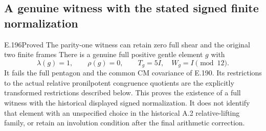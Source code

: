 \subsection{A genuine witness with the stated signed finite normalization}

\begin{result}{E.196}{Proved}
{The parity-one witness can retain zero full shear and the original two finite frames}
There is a genuine full positive gentle element \(g\) with
\[
       \lambda(g)=1,\qquad \rho(g)=0,\qquad
       T_g=5I,\quad W_g=I\pmod{12}.
\tag{E.196.1}
\]
It fails the full pentagon and the common CM covariance
of E.190.  Its restrictions to the actual relative
pronilpotent congruence quotients are the explicitly
transformed restrictions described below.
This proves the existence of a full witness with the
historical displayed signed normalization.
It does not identify that element with an unspecified
choice in the historical A.2 relative-lifting family,
or retain an involution condition after the final
arithmetic correction.
\end{result}

